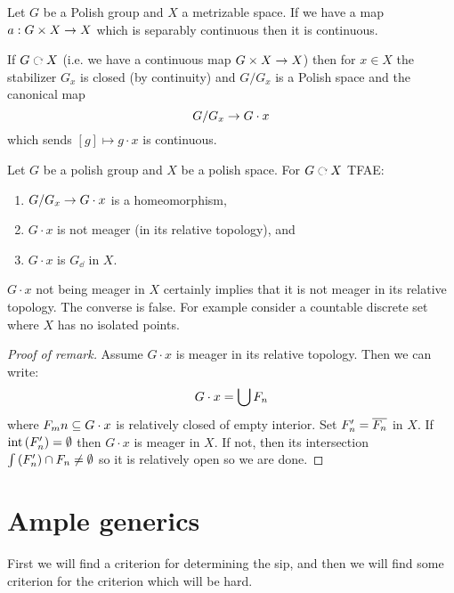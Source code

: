 \documentclass{amsart}
\begin{document}
\begin{prop}
Let $G$ be a Polish group and $X$ a metrizable space. If we have a map 
$a : G\times X\rightarrow X$ which is separably continuous then it is continuous.
\end{prop}

If $G\acts X$ (i.e. we have a continuous map $G\times X\rightarrow X$) then for $x\in X$
the stabilizer $G_x$ is closed (by continuity) and $G / G_x$ is a Polish space and the
canonical map 
\begin{equation}
G / G_x \rightarrow G\cdot x
\end{equation}
which sends $\left[ g \right] \mapsto g\cdot x$ is continuous.

\begin{thm}[Effros]
Let $G$ be a polish group and $X$ be a polish space. For $G\acts X$ TFAE:
\begin{enumerate}[label = (\iii)]
\item $G/ G_x \rightarrow G\cdot x$ is a homeomorphism,
\item $G\cdot x$ is not meager (in its relative topology), and
\item $G\cdot x$ is $G_\dd$ in $X$.
\end{enumerate}
\label{thm:eff}
\end{thm}

\begin{rmk}
$G\cdot x$ not being meager in $X$ certainly implies that it is not meager in its relative
topology. The converse is false. For example consider a countable discrete set where $X$
has no isolated points.
\end{rmk}

\begin{proof}[Proof of remark]
Assume $G\cdot x$ is meager in its relative topology. Then we can write:
\begin{equation}
G\cdot x = \bigcup F_n
\end{equation}
where $F_mn\subseteq G\cdot x$ is relatively closed of empty interior. 
Set $F_n' = \overline{F_n}$ in $X$. 
If $\operatorname{int}\left(F_n'\right)=\emptyset$ then $G\cdot x$ is meager in $X$.
If not, then its intersection
$\int\left( F_n' \right)\cap F_n \neq \emptyset$ so it is relatively open so we are done.
\end{proof}

\section{Ample generics}

First we will find a criterion for determining the sip, and then we will find some
criterion for the criterion which will be hard.
\end{document}
